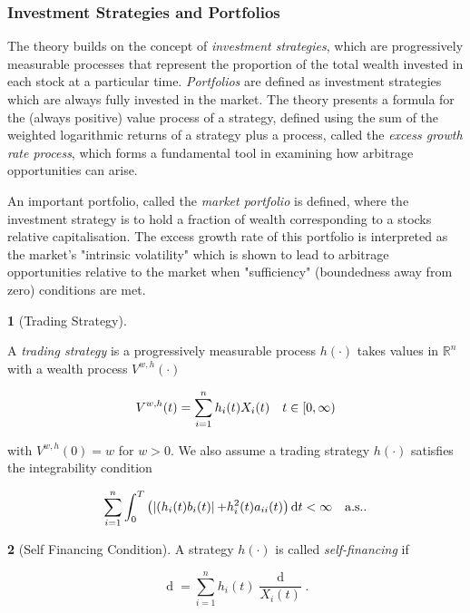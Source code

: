 \documentclass[british]{amsart} \usepackage{lmodern}
\numberwithin{equation}{section} \numberwithin{figure}{section}
\theoremstyle{plain} \newtheorem{thm}{\protect\theoremname}[section]
\theoremstyle{definition} \newtheorem{defn}[thm]{\protect\definitionname}
\theoremstyle{plain} \newtheorem{assumption}[thm]{\protect\assumptionname}
\theoremstyle{plain} \newtheorem{lem}[thm]{\protect\lemmaname}
\theoremstyle{plain} \newtheorem{prop}[thm]{\protect\propositionname}
\theoremstyle{remark} \newtheorem{rem}[thm]{\protect\remarkname}
\theoremstyle{plain} \newtheorem{cor}[thm]{\protect\corollaryname}
\renewcommand{\d}[1]{\mathop{\mathrm{d}{#1}}}
\newcommand{\abs}[1]{\mathop{|{#1}|}} \newcommand{\market}{\mathcal{M}}
\begin{document}
\subsubsection{Investment Strategies and Portfolios}

The theory builds on the concept of \textit{investment strategies}, which are
progressively measurable processes that represent the proportion of the total
wealth invested in each stock at a particular time. \textit{Portfolios} are defined as
investment strategies which are always fully invested in the market. The theory
presents a formula for the (always positive) value process of a strategy,
defined using the sum of the weighted logarithmic returns of a strategy plus a
process, called the \textit{excess growth rate process}, which forms a
fundamental tool in examining how arbitrage opportunities can arise.

An important portfolio, called the \textit{market portfolio} is defined, where the
investment strategy is to hold a fraction of wealth corresponding to a stocks
relative capitalisation. The excess growth rate of this portfolio is interpreted
as the market's "intrinsic volatility" which is shown to lead to arbitrage
opportunities relative to the market when "sufficiency" (boundedness away from
zero) conditions are met.

\begin{defn} [Trading Strategy]
  \label{def:tradingstrategy}

  A \textit{trading strategy} is a progressively measurable process $h(\cdot)$ 
  takes values in $\mathbb{R}^{n}$ with a wealth process $V^{w,h}(\cdot)$ 

  \begin{equation*}
    V^{w,h}(t) = \sum_{i=1}^{n} h_{i}(t) X_{i}(t) 
    \quad t\in[0,\infty)
  \end{equation*}

  with $V^{w,h}(0)=w$ for $w > 0$. We also assume a trading strategy $h(\cdot)$  
  satisfies the integrability condition

  \begin{equation*}
    \sum_{i=1}^{n} \int_{0}^{T} 
    \left(
    \abs{(h_{i}(t)b_{i}(t)} + h_{i}^2(t)a_{ii}(t)
      \right) \d{t} < \infty
    \quad \almostsurely.
  \end{equation*}

\end{defn}

\begin{defn} [Self Financing Condition]
  \label{def:selffinancingcondition}  
  A strategy $h(\cdot)$ is called \textit{self-financing} if 
  
  \begin{equation}
    \d{V^{w,h}(t)} = \sum_{i=1}^{n} h_{i}(t) \frac{\d{X_{i}(t)}}{X_{i}(t)}.
  \end{equation}

\end{defn}
\end{document}
